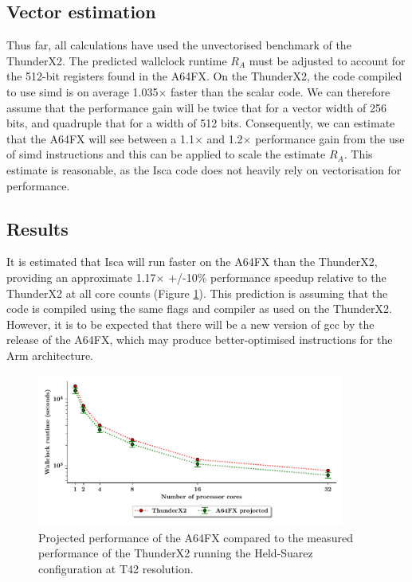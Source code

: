\documentclass[a4paper,11pt]{report}
\begin{document}
\subsection{Vector estimation}
Thus far, all calculations have used the unvectorised benchmark of the ThunderX2. The predicted wallclock runtime $R_{A}$ must be adjusted to account for the 512-bit registers found in the A64FX. On the ThunderX2, the code compiled to use \gls{simd} is on average 1.035$\times$ faster than the scalar code. We can therefore assume that the performance gain will be twice that for a vector width of 256 bits, and quadruple that for a width of 512 bits. Consequently, we can estimate that the A64FX will see between a 1.1$\times$ and 1.2$\times$ performance gain from the use of \gls{simd} instructions and this can be applied to scale the estimate $R_{A}$. This estimate is reasonable, as the Isca code does not heavily rely on vectorisation for performance. 

\subsection{Results}
It is estimated that Isca will run faster on the A64FX than the ThunderX2, providing an approximate 1.17$\times$ +/-10\% performance speedup relative to the ThunderX2 at all core counts (Figure \ref{fig:projection}). This prediction is assuming that the code is compiled using the same flags and compiler as used on the ThunderX2. However, it is to be expected that there will be a new version of \gls{gcc} by the release of the A64FX, which may produce better-optimised instructions for the Arm architecture.
\begin{figure}[htbp]
\begin{center}
\includegraphics[width=0.9\textwidth]{img/a64fx-projection.pdf}
\caption[Projected performance of the A64FX]{Projected performance of the A64FX compared to the measured performance of the ThunderX2 running the Held-Suarez configuration at T42 resolution. }
\label{fig:projection}
\end{center}
\end{figure}
\end{document}
